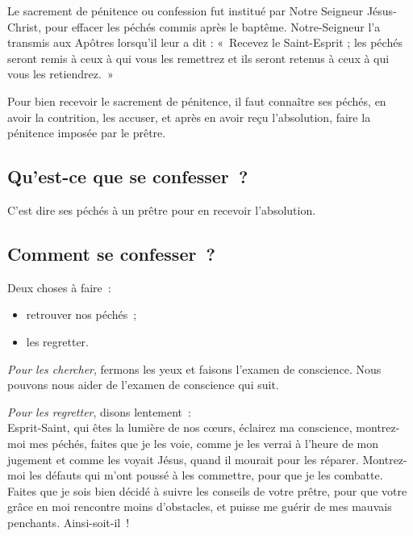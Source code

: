 \documentclass[%
a5paper%
,11pt%
,DIV=15%
,titlepage=on%
,headings=optiontoheadandtoc%
,headings=small%
,parskip=false%
,titlepage%
,openany%
]{scrbook}
\let\oldaddchap\addchap
\def\addchap#1{\oldaddchap{#1}\markright{Pèlerinage du Christ-Roi}}
\begin{document}

%




Le sacrement de pénitence ou confession fut institué par Notre Seigneur Jésus-Christ, pour effacer les péchés commis après le baptême. Notre-Seigneur l’a transmis aux Apôtres lorsqu’il leur a dit : « Recevez le Saint-Esprit ; les péchés seront remis à ceux à qui vous les remettrez et ils seront retenus à ceux à qui vous les retiendrez. »



Pour bien recevoir le sacrement de pénitence, il faut connaître ses péchés, en avoir la contrition, les accuser, et après en avoir reçu l’absolution, faire la pénitence imposée par le prêtre.

\subsection*{Qu’est-ce que se confesser ?}

C’est dire ses péchés à un prêtre pour en recevoir l’absolution.

\subsection*{Comment se confesser ?}

Deux choses à faire :
\begin{itemize}
\item retrouver nos péchés ;
\item les regretter.
\end{itemize}

\emph{Pour les chercher}, fermons les yeux et faisons l’examen de conscience. Nous pouvons nous aider de l’examen de conscience qui suit.
\pagebreak[3]

\emph{Pour les regretter}, disons lentement :\\
Esprit-Saint, qui êtes la lumière de nos cœurs, éclairez ma conscience, montrez-moi mes péchés, faites que je les voie, comme je les verrai à l’heure de mon jugement et comme les voyait Jésus, quand il mourait pour les réparer. Montrez-moi les défauts qui m’ont poussé à les commettre, pour que je les combatte. Faites que je sois bien décidé à suivre les conseils de votre prêtre, pour que votre grâce en moi rencontre moins d’obstacles, et puisse me guérir de mes mauvais penchants. Ainsi-soit-il !
\end{document}
